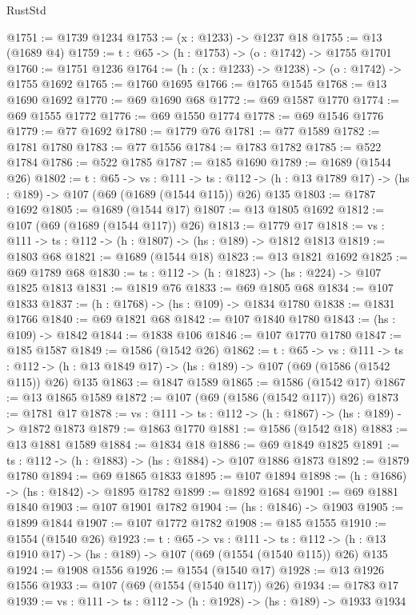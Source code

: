 \begin{lexlean}{RustStd}
\begin{coremodule}
{\begin{coremodule}
{{{{{{{{{@1751 := @1739 @1234
@1753 := (x : @1233) -> @1237 @18
@1755 := @13 (@1689 @4)
@1759 := {t : @65} -> (h : @1753) -> (o : @1742) -> @1755 @1701
@1760 := @1751 @1236
@1764 := (h : (x : @1233) -> @1238) -> (o : @1742) -> @1755 @1692
@1765 := @1760 @1695
@1766 := @1765 @1545
@1768 := @13 @1690 @1692
@1770 := @69 @1690 @68
@1772 := @69 @1587 @1770
@1774 := @69 @1555 @1772
@1776 := @69 @1550 @1774
@1778 := @69 @1546 @1776
@1779 := @77 @1692
@1780 := @1779 @76
@1781 := @77 @1589
@1782 := @1781 @1780
@1783 := @77 @1556
@1784 := @1783 @1782
@1785 := @522 @1784
@1786 := @522 @1785
@1787 := @185 @1690
@1789 := @1689 (@1544 @26)
@1802 := {t : @65} ->
  {vs : @111} ->
  {ts : @112} -> (h : @13 @1789 @17) -> (hs : @189) -> @107 (@69 (@1689 (@1544 @115)) @26) @135
@1803 := @1787 @1692
@1805 := @1689 (@1544 @17)
@1807 := @13 @1805 @1692
@1812 := @107 (@69 (@1689 (@1544 @117)) @26)
@1813 := @1779 @17
@1818 := {vs : @111} -> {ts : @112} -> (h : @1807) -> (hs : @189) -> @1812 @1813
@1819 := @1803 @68
@1821 := @1689 (@1544 @18)
@1823 := @13 @1821 @1692
@1825 := @69 @1789 @68
@1830 := {ts : @112} -> (h : @1823) -> (hs : @224) -> @107 @1825 @1813
@1831 := @1819 @76
@1833 := @69 @1805 @68
@1834 := @107 @1833
@1837 := (h : @1768) -> (hs : @109) -> @1834 @1780
@1838 := @1831 @1766
@1840 := @69 @1821 @68
@1842 := @107 @1840 @1780
@1843 := (hs : @109) -> @1842
@1844 := @1838 @106
@1846 := @107 @1770 @1780
@1847 := @185 @1587
@1849 := @1586 (@1542 @26)
@1862 := {t : @65} ->
  {vs : @111} ->
  {ts : @112} -> (h : @13 @1849 @17) -> (hs : @189) -> @107 (@69 (@1586 (@1542 @115)) @26) @135
@1863 := @1847 @1589
@1865 := @1586 (@1542 @17)
@1867 := @13 @1865 @1589
@1872 := @107 (@69 (@1586 (@1542 @117)) @26)
@1873 := @1781 @17
@1878 := {vs : @111} -> {ts : @112} -> (h : @1867) -> (hs : @189) -> @1872 @1873
@1879 := @1863 @1770
@1881 := @1586 (@1542 @18)
@1883 := @13 @1881 @1589
@1884 := @1834 @18
@1886 := @69 @1849 @1825
@1891 := {ts : @112} -> (h : @1883) -> (hs : @1884) -> @107 @1886 @1873
@1892 := @1879 @1780
@1894 := @69 @1865 @1833
@1895 := @107 @1894
@1898 := (h : @1686) -> (hs : @1842) -> @1895 @1782
@1899 := @1892 @1684
@1901 := @69 @1881 @1840
@1903 := @107 @1901 @1782
@1904 := (hs : @1846) -> @1903
@1905 := @1899 @1844
@1907 := @107 @1772 @1782
@1908 := @185 @1555
@1910 := @1554 (@1540 @26)
@1923 := {t : @65} ->
  {vs : @111} ->
  {ts : @112} -> (h : @13 @1910 @17) -> (hs : @189) -> @107 (@69 (@1554 (@1540 @115)) @26) @135
@1924 := @1908 @1556
@1926 := @1554 (@1540 @17)
@1928 := @13 @1926 @1556
@1933 := @107 (@69 (@1554 (@1540 @117)) @26)
@1934 := @1783 @17
@1939 := {vs : @111} -> {ts : @112} -> (h : @1928) -> (hs : @189) -> @1933 @1934
}}}}}}}}}
\end{coremodule}}
\end{coremodule}
\end{lexlean}

